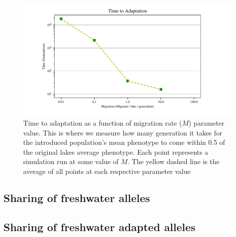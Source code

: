 \documentclass{article}
\begin{document}
\begin{figure}
	\begin{center}
  		\includegraphics{Final_Plots/Time_Adapt.pdf}
  		\caption{
		Time to adaptation as a function of migration rate ($M$) parameter value. This is where we measure how many generation
		it takes for the introduced population's mean phenotype to come within 0.5 of the original lakes average phenotype. 
		Each point represents a simulation run at some value of $M$. 
		The yellow dashed line is the average of all points at each respective parameter value}
  		\label{fig:TimeToAdaptation}
	\end{center}
\end{figure}

\subsection*{Sharing of freshwater alleles}

\subsection*{Sharing of freshwater adapted alleles}
\end{document}
